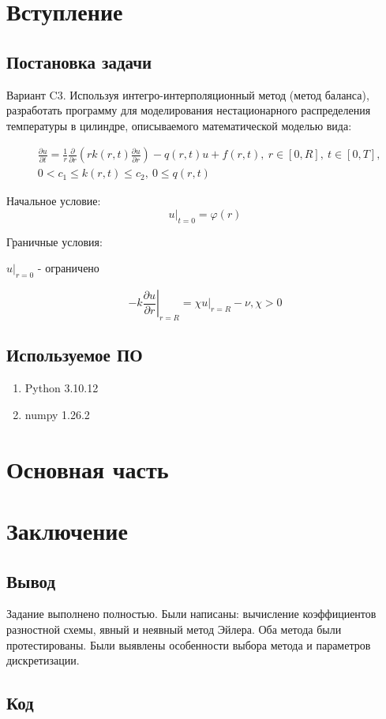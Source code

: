 \documentclass[a4paper,12pt]{article}
\begin{document}
	
	\newpage
	\tableofcontents
	\newpage

	\section{Вступление}
	\subsection{Постановка задачи}

	Вариант C3. Используя интегро-интерполяционный метод (метод баланса), разработать программу для моделирования нестационарного распределения температуры в цилиндре, описываемого математической моделью вида:
 
	\begin{align*}
		&\frac{\partial u}{\partial t} = \frac{1}{r} \frac{\partial}{\partial r}
		\left ( rk(r, t)\frac{\partial u}{\partial r} \right ) - q(r, t)u + f(r,t),
		\ r \in \left[ 0, R\right],\ t \in [0, T],
		\\
		&0 < c_1 \leq k(r, t) \leq c_2,\ 0 \leq q(r, t)
	\end{align*}

	Начальное условие:
	\[
		\left. u \right\vert_{t=0} = \varphi(r)
	\]

	Граничные условия: 
 
    \centerline{\(\left. u\right\vert_{r = 0}\) - ограничено}
    \[-k \left. \frac{\partial u}{\partial r}\right\vert_{r = R} = \chi\left.u\right\vert_{r = R} - \nu, \chi > 0\]
    
	\subsection{Используемое ПО}

	\begin{enumerate}
    \item Python 3.10.12
    \item numpy 1.26.2
    \end{enumerate}
	\newpage

	\section{Основная часть}
	
	
	
	\newpage

	\section{Заключение}
	\subsection{Вывод}
	Задание выполнено полностью. Были написаны: вычисление коэффициентов разностной схемы, явный и неявный метод Эйлера.
	Оба метода были протестированы. Были выявлены особенности выбора метода и параметров дискретизации.
	\newpage
	\subsection{Код}
	\inputminted{python}{main.py}
\end{document}
